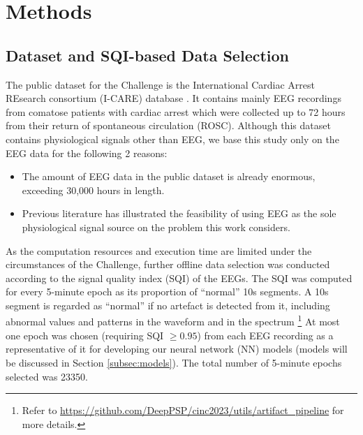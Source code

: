 \section{Methods}
\label{sec:methods}


\subsection{Dataset and SQI-based Data Selection}
\label{subsec:data_selection}

The public dataset for the Challenge is the International Cardiac Arrest REsearch consortium (I-CARE) database \cite{ICAREDatabase}. It contains mainly EEG recordings from comatose patients with cardiac arrest which were collected up to 72 hours from their return of spontaneous circulation (ROSC). Although this dataset contains physiological signals other than EEG, we base this study only on the EEG data for the following 2 reasons:
\begin{itemize}
    \item The amount of EEG data in the public dataset is already enormous, exceeding 30,000 hours in length.
    \item Previous literature \cite{Zheng_2021_coma} has illustrated the feasibility of using EEG as the sole physiological signal source on the problem this work considers.
\end{itemize}

As the computation resources and execution time are limited under the circumstances of the Challenge, further offline data selection was conducted according to the signal quality index (SQI) of the EEGs. The SQI was computed for every 5-minute epoch as its proportion of ``normal'' 10s segments. A 10s segment is regarded as ``normal'' if no artefact is detected from it, including abnormal values and patterns in the waveform and in the spectrum \footnote{Refer to \url{https://github.com/DeepPSP/cinc2023/utils/artifact_pipeline} for more details.}
At most one epoch was chosen (requiring SQI $\ge 0.95$) from each EEG recording as a representative of it for developing our neural network (NN) models (models will be discussed in Section \ref{subsec:models}). The total number of 5-minute epochs selected was 23350.



